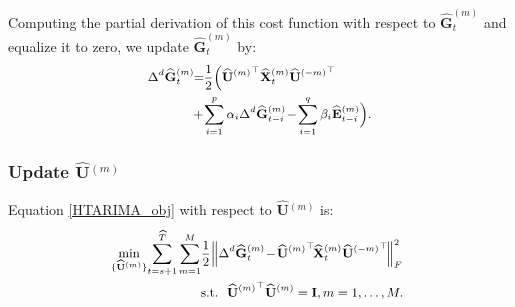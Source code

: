 \documentclass[letterpaper]{article} %
\numberwithin{theorem}{section}
\begin{document}
Computing  the partial derivation of this cost function  with respect to ${\widehat{\mathbf{G}}^{(m)}_{t}} $ and equalize it  to zero, we  update $\widehat{\mathbf{G}}^{(m)}_{t}  $ by:
\begin{equation}\label{HTARIMA_UpdateG}
\small 
\begin{aligned}
\Delta^d  \widehat{\mathbf{G}}^{(m)}_{t}  \hspace{-0.1cm} & = \hspace{-0.1cm}  \frac{1}{2} \Big ( \widehat{\mathbf U}{^{(m)}}^\top {\widehat{\mathbf{X}}^{(m)}_{t}} \widehat{ \mathbf U}{^{(-m)}}^\top   \hspace{-0.05cm} \\ &  + \hspace{-0.05cm} \sum_{i=1}^{p} \alpha_i  \Delta^d  {\widehat{\mathbf{G}}^{(m)}_{{t-i}}}   \hspace{-0.05cm}- \hspace{-0.05cm}  \sum_{i=1}^{q} \beta_i {\widehat{\mathbf{E}}^{(m)}_{{t-i}}}            \Big).
\end{aligned}
\end{equation}

\subsubsection{Update $ \widehat{ \mathbf U}{^{(m)}} $  }
Equation \eqref{HTARIMA_obj} with respect to $ \widehat{ \mathbf U}{^{(m)}} $   is: 
\begin{equation}\label{HTARIMA_updateU0}
\small 
\begin{aligned}
\hspace{-0.1cm} \mathop{\min}_{ \{\widehat{ \mathbf U}{^{(m)}} \} }  \hspace{-0.05cm}  \sum_{t=s+1}^{\widehat{T}}  \hspace{-0.01cm} \sum_{m=1}^{M}  &    \frac{1}{2}  \Big \|   \Delta^d  {\widehat{\mathbf{G}}^{(m)}_{t}}  \hspace{-0.05cm}   -   \hspace{-0.05cm} \widehat{\mathbf U}{^{(m)}}^\top  \hspace{-0.05cm}  {\widehat{\mathbf{X}}^{(m)}_{t}}  \widehat{ \mathbf U}{^{(-m)}}^\top  \hspace{-0.05cm}  \Big  \| _F^2  
\\ & \text{s.t.}  \ \ \widehat{ \mathbf U}{^{(m)}}^\top \widehat{ \mathbf U}{^{(m)}} = \mathbf I, m = 1,\ldots, M.
\end{aligned}
\end{equation}
\end{document}

